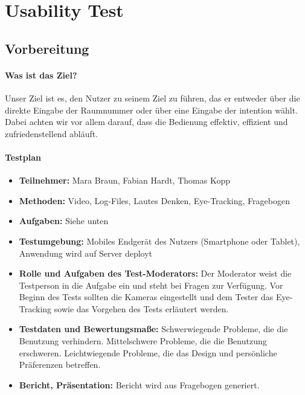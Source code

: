 \chapter{Usability Test}

\section{Vorbereitung}

\subsubsection*{Was ist das Ziel?}
Unser Ziel ist es, den Nutzer zu seinem Ziel zu führen, das er entweder über die direkte Eingabe der Raumnummer oder über eine Eingabe der \gls{intention} wählt.
Dabei achten wir vor allem darauf, dass die Bedienung effektiv, effizient und zufriedenstellend abläuft.
\subsubsection*{Testplan}
\begin{itemize}
\item \textbf{Teilnehmer:} Mara Braun, Fabian Hardt, Thomas Kopp
\item \textbf{Methoden:} Video, Log-Files, Lautes Denken, Eye-Tracking, Fragebogen
\item \textbf{Aufgaben:} Siehe unten
\item \textbf{Testumgebung:} Mobiles Endgerät des Nutzers (Smartphone oder Tablet), Anwendung wird auf Server deployt
\item \textbf{Rolle und Aufgaben des Test-Moderators:} Der Moderator weist die Testperson in die Aufgabe ein und steht bei Fragen zur Verfügung. Vor Beginn des Tests sollten die Kameras eingestellt und dem Tester das Eye-Tracking sowie das Vorgehen des Tests erläutert werden.
\item \textbf{Testdaten und Bewertungsmaße:} Schwerwiegende Probleme, die die Benutzung verhindern. Mittelschwere Probleme, die die Benutzung erschweren. Leichtwiegende Probleme, die das Design und persönliche Präferenzen betreffen.
\item \textbf{Bericht, Präsentation:} Bericht wird aus Fragebogen generiert.
\end{itemize}

\newpage


